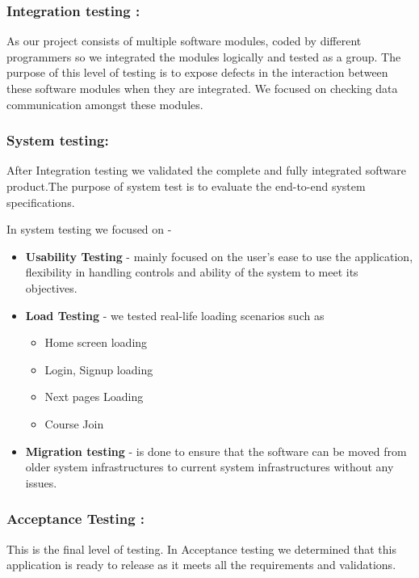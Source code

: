 \documentclass[10pt]{article}
\begin{document}
\subsubsection{Integration testing : }

As our project consists of multiple software modules, coded by different programmers so we integrated the modules logically and tested as a group. The purpose of this level of testing is to expose defects in the interaction between these software modules when they are integrated. We focused on checking data communication amongst these modules.

\subsubsection{System testing: }

After Integration testing we  validated the complete and fully integrated software product.The purpose of  system test is to evaluate the end-to-end system specifications.

In system testing we focused on -

\begin{itemize}
  \item \textbf{Usability Testing} - mainly focused on the user's ease to use the application, flexibility in handling controls and ability of the system to meet its objectives.
  \item \textbf{Load Testing} - we tested real-life loading scenarios such as

        \begin{itemize}
          \item Home screen loading
          \item Login, Signup loading
          \item Next pages Loading
          \item Course Join
        \end{itemize}


  \item \textbf{Migration testing} - is done to ensure that the software can be moved from older system infrastructures to current system infrastructures without any issues.
\end{itemize}

\subsubsection{Acceptance Testing : }

This is the final level of testing. In Acceptance testing we determined that this application is ready to release as it meets all the requirements and validations.
\end{document}
